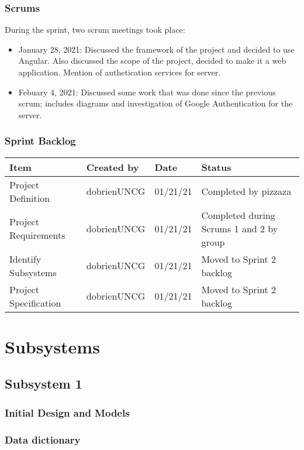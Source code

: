\documentclass{article}
\begin{document}
\subsubsection{Scrums}
During the sprint, two scrum meetings took place:
\begin{itemize}
 \item January 28, 2021: Discussed the framework of the project and decided to use Angular. Also discussed the scope of the project, decided to make it a web application. Mention of authetication services for server.
\item Febuary 4, 2021: Discussed some work that was done since the previous scrum;  includes diagrams and investigation of Google Authentication for the server.
\end{itemize}
\subsubsection{Sprint Backlog}
\begin{tabular}{|p{}| p{}|p{}|p{}|}
\hline
Item & Created by & Date & Status\\\hline
Project Definition & dobrienUNCG  & 01/21/21 &  Completed by pizzaza\\\hline
Project Requirements & dobrienUNCG & 01/21/21  & Completed during Scrums 1 and 2 by group\\\hline
Identify Subsystems & dobrienUNCG & 01/21/21 & Moved to Sprint 2 backlog\\\hline
Project Specification & dobrienUNCG & 01/21/21 & Moved to Sprint 2 backlog \\\hline
\end{tabular}


\newpage
\section{Subsystems}
\subsection{Subsystem 1}
\subsubsection{Initial Design and Models}
\subsubsection{Data dictionary}
\end{document}

